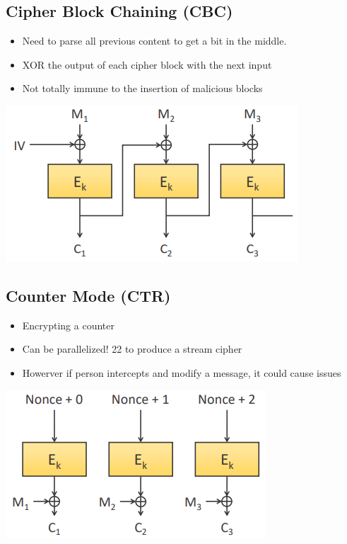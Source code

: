 \documentclass{article}
\begin{document}
\subsection{Cipher Block Chaining (CBC)}
\begin{itemize}
  \item Need to parse all previous content to get a bit in the middle.
  \item XOR the output of each cipher block with the next input 
  \item Not totally immune to the insertion of malicious blocks
\end{itemize}
\begin{center}
  \includegraphics[scale=0.5]{cbc.png}
\end{center}

\subsection{Counter Mode (CTR)}
\begin{itemize}
  \item Encrypting a counter 
  \item Can be parallelized! 22 to produce a stream cipher
  \item Howerver if person intercepts and modify a message, it could cause issues
\end{itemize}
\begin{center}
  \includegraphics[scale=0.5]{ctr.png}
\end{center}
\end{document}
